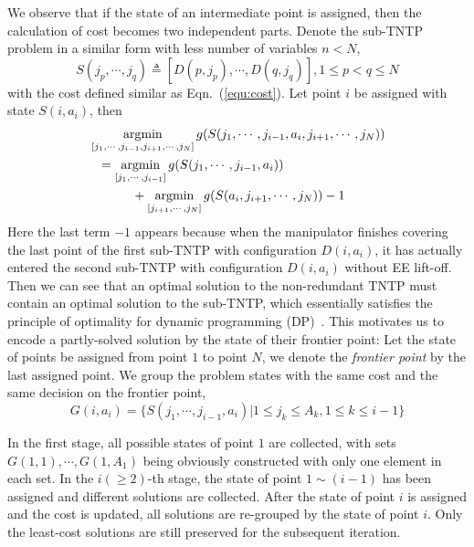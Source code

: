 \documentclass[letterpaper, 10 pt, conference]{ieeeconf}  %
\begin{document}
We observe that if the state of an intermediate point is assigned, then the calculation of cost becomes two independent parts. Denote the sub-TNTP problem in a similar form with less number of variables $n<N$, 
\begin{equation}
S(j_p, \cdots, j_q) \triangleq [D(p, j_p), \cdots, D(q, j_q)], 1\leq p <q \leq N
\end{equation}
with the cost defined similar as Eqn.~(\ref{equ:cost}). 
Let point $i$ be assigned with state $S(i, a_i)$, then 
\begin{equation}
\begin{aligned}
&\mathop{\rm argmin}\limits_{[j_1, \cdots, j_{i-1}, j_{i+1}, \cdots, j_N]} g(S(j_1, \cdots, j_{i-1}, a_i, j_{i+1}, \cdots, j_N))\\
&~~= \mathop{\rm argmin}\limits_{[j_1, \cdots, j_{i-1}]} g(S(j_1, \cdots, j_{i-1}, a_i))\\
&~~~~~~~~~~+\mathop{\rm argmin}\limits_{[j_{i+1}, \cdots, j_N]} g(S(a_i, j_{i+1}, \cdots, j_N))-1
\end{aligned}
\end{equation}
Here the last term $-1$ appears because when the manipulator finishes covering the last point of the first sub-TNTP with configuration $D(i, a_i)$, it has actually entered the second sub-TNTP with configuration $D(i, a_i)$ without EE lift-off. 
Then we can see that an optimal solution to the non-redundant TNTP must contain an optimal solution to the sub-TNTP, which essentially satisfies the principle of optimality for dynamic programming (DP)~\cite{Bellman2013Dynamic}. 
This motivates us to encode a partly-solved solution by the state of their frontier point:  
Let the state of points be assigned from point $1$ to point $N$, we denote the \textit{frontier point} by the last assigned point. 
We group the problem states with the same cost and the same decision on the frontier point, 
\begin{equation}
G(i, a_i) = \{S(j_1, \cdots, j_{i-1}, a_i)|1\leq j_k \leq A_k, 1\leq k\leq i-1\}
\end{equation}

In the first stage, all possible states of point $1$ are collected, with sets $G(1, 1), \cdots, G(1, A_1)$ being obviously constructed with only one element in each set. 
In the $i(\geq 2)$-th stage, the state of point $1\sim(i-1)$ has been assigned and different solutions are collected. After the state of point $i$ is assigned and the cost is updated, all solutions are re-grouped by the state of point $i$. Only the least-cost solutions are still preserved for the subsequent iteration. 
\end{document}
